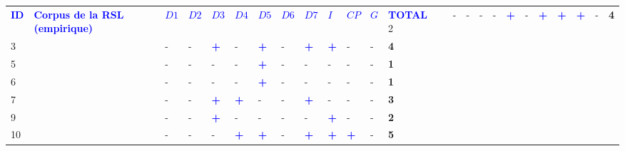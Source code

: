         \begin{longtable}{p{0.5cm}p{4.6cm}p{0.3cm}p{0.3cm}p{0.3cm}p{0.3cm}p{0.3cm}p{0.3cm}p{0.3cm}p{0.3cm}p{0.3cm}p{0.3cm}p{1cm}}
        \hline
        \small{\textcolor{blue}{\textbf{ID}}} & \small{\textcolor{blue}{\textbf{Corpus de la \acrshort{RSL} (empirique)}}} & \small{\textcolor{blue}{\textbf{$D1$}}} & \small{\textcolor{blue}{\textbf{$D2$}}} & \small{\textcolor{blue}{\textbf{$D3$}}} & \small{\textcolor{blue}{\textbf{$D4$}}} & \small{\textcolor{blue}{\textbf{$D5$}}} & \small{\textcolor{blue}{\textbf{$D6$}}} & \small{\textcolor{blue}{\textbf{$D7$}}} & \small{\textcolor{blue}{\textbf{$I$}}} & \small{\textcolor{blue}{\textbf{$CP$}}} & \small{\textcolor{blue}{\textbf{$G$}}} & \small{\textcolor{blue}{\textbf{TOTAL}}}
        \hline
        \endhead
    \small{2} & \small{\textcite{adnan_last-mile_2019}} & - & - & - & - & \textcolor{blue}{\textbf{+}} & - & \textcolor{blue}{\textbf{+}} & \textcolor{blue}{\textbf{+}} & \textcolor{blue}{\textbf{+}} & - & \textbf{4}\\
    \small{3} & \small{\textcite{advani_bicycle_2006}} & - & - & \textcolor{blue}{\textbf{+}} & - & \textcolor{blue}{\textbf{+}} & - & \textcolor{blue}{\textbf{+}} & \textcolor{blue}{\textbf{+}} & - & - & \textbf{4}\\
    \small{5} & \small{\textcite{andersson_neighbourhood_2021}} & - & - & - & - & \textcolor{blue}{\textbf{+}} & - & - & - & - & - & \textbf{1}\\
    \small{6} & \small{\textcite{ann_examination_2019}} & - & - & - & - & \textcolor{blue}{\textbf{+}} & - & - & - & - & - & \textbf{1}\\
    \small{7} & \small{\textcite{arbis_analysis_2016}} & - & - & \textcolor{blue}{\textbf{+}} & \textcolor{blue}{\textbf{+}} & - & - & \textcolor{blue}{\textbf{+}} & - & - & - & \textbf{3}\\
    \small{9} & \small{\textcite{ashraf_impacts_2021}} & - & - & \textcolor{blue}{\textbf{+}} & - & - & - & - & \textcolor{blue}{\textbf{+}} & - & - & \textbf{2}\\
    \small{10} & \small{\textcite{bachand-marleau_much-anticipated_2011}} & - & - & - & \textcolor{blue}{\textbf{+}} & \textcolor{blue}{\textbf{+}} & - & \textcolor{blue}{\textbf{+}} & \textcolor{blue}{\textbf{+}} & \textcolor{blue}{\textbf{+}} & - & \textbf{5}\\

\end{longtable}
